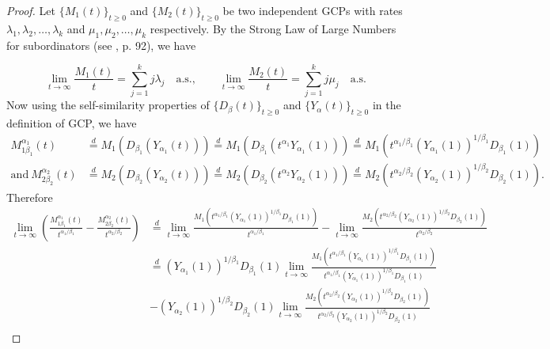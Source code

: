 \documentclass[11pt,oneside,reqno]{amsart}
\theoremstyle{definition}
\theoremstyle{remarkstyle}
\begin{document}
\begin{proof}
Let $\{M_1(t)\}_{t\geq 0}$ and $\{M_2(t)\}_{t\geq 0}$ be two independent GCPs with rates $\lambda_1,\lambda_2,\dots,\lambda_k$ and $\mu_1,\mu_2,\dots,\mu_k$ respectively.
By the Strong Law of Large Numbers for subordinators (see \citet{Bertoin2004}, p. 92), we have

\begin{equation}
    \lim_{t\rightarrow \infty}\frac{M_1(t)}{t}=\sum_{j=1}^{k}j\lambda_j\quad\text{a.s.},\qquad \lim_{t\rightarrow \infty}\frac{M_2(t)}{t}=\sum_{j=1}^{k}j\mu_j\quad\text{a.s.} \label{GCP/t_limit}
\end{equation}
Now using the self-similarity properties of $\{D_\beta(t)\}_{t\geq 0}$ and $\{Y_\alpha(t)\}_{t \geq 0}$ in the definition of GCP, we have
\begin{align} M_{1\beta_1}^{\alpha_1}(t)&\overset{d}{=}M_1(D_{\beta_1}(Y_{\alpha_1}(t)))\overset{d}{=}M_1(D_{\beta_1}(t^{\alpha_1} Y_{\alpha_1}(1)))\overset{d}{=}M_1(t^{\alpha_1/\beta_1}(Y_{\alpha_1}(1))^{1/\beta_1}D_{\beta_1}(1))\nonumber\\
\text{and}~M_{2\beta_2}^{\alpha_2}(t)&\overset{d}{=}M_2(D_{\beta_2}(Y_{\alpha_2}(t)))\overset{d}{=}M_2(D_{\beta_2}(t^{\alpha_2} Y_{\alpha_2}(1)))\overset{d}{=}M_2(t^{\alpha_2/\beta_2}(Y_{\alpha_2}(1))^{1/\beta_2}D_{\beta_2}(1)).\nonumber
\end{align}
Therefore
\begin{align}
    \lim_{t\rightarrow \infty}(\frac{M_{1\beta_1}^{\alpha_1}(t)}{t^{\alpha_1/\beta_1}}-\frac{M_{2\beta_2}^{\alpha_2}(t)}{t^{\alpha_2/\beta_2}})&\overset{d}{=}\lim_{t\rightarrow \infty}\frac{M_1(t^{\alpha_1/\beta_1}(Y_{\alpha_1}(1))^{1/\beta_1}D_{\beta_1}(1))}{t^{\alpha_1/{\beta_1}}}-\lim_{t\rightarrow \infty}\frac{M_2(t^{\alpha_2/\beta_2}(Y_{\alpha_2}(1))^{1/\beta_2}D_{\beta_2}(1))}{t^{\alpha_2/{\beta_2}}}\nonumber\\
    &\overset{d}{=}(Y_{\alpha_1}(1))^{1/\beta_1}D_{\beta_1}(1)\lim_{t\rightarrow \infty}\frac{M_1(t^{\alpha_1/\beta_1}(Y_{\alpha_1}(1))^{1/\beta_1}D_{\beta_1}(1))}{t^{\alpha_1/{\beta_1}}(Y_{\alpha_1}(1))^{1/\beta_1}D_{\beta_1}(1)}\nonumber\\
    &-(Y_{\alpha_2}(1))^{1/\beta_2}D_{\beta_2}(1)\lim_{t\rightarrow \infty}\frac{M_2(t^{\alpha_2/\beta_2}(Y_{\alpha_2}(1))^{1/\beta_2}D_{\beta_2}(1))}{t^{\alpha_2/{\beta_2}}(Y_{\alpha_2}(1))^{1/\beta_2}D_{\beta_2}(1)}\nonumber\\

\end{align}
\end{proof}
\end{document}
